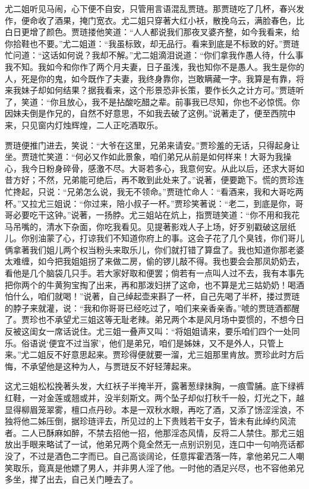 \begin{parag}


    尤二姐听见马闹，心下便不自安，只管用言语混乱贾琏。那贾琏吃了几杯，春兴发作，便命收了酒果，掩门宽衣。尤二姐只穿著大红小袄，散挽乌云，满脸春色，比白日更增了颜色。贾琏搂他笑道：“人人都说我们那夜叉婆齐整，如今我看来，给你拾鞋也不要。”尤二姐道：“我虽标致，却无品行。看来到底是不标致的好。”贾琏忙问道：“这话如何说？我却不解。”尤二姐滴泪说道：“你们拿我作愚人待，什么事我不知。我如今和你作了两个月夫妻，日子虽浅，我也知你不是愚人。我生是你的人，死是你的鬼，如今既作了夫妻，我终身靠你，岂敢瞒藏一字。我算是有靠，将来我妹子却如何结果？据我看来，这个形景恐非长策，要作长久之计方可。”贾琏听了，笑道：“你且放心，我不是拈酸吃醋之辈。前事我已尽知，你也不必惊慌。你因妹夫倒是作兄的，自然不好意思，不如我去破了这例。”说著走了，便至西院中来，只见窗内灯烛辉煌，二人正吃酒取乐。
\end{parag}


\begin{parag}


    贾琏便推门进去，笑说：“大爷在这里，兄弟来请安。”贾珍羞的无话，只得起身让坐。贾琏忙笑道：“何必又作如此景象，咱们弟兄从前是如何样来！大哥为我操心，我今日粉身碎骨，感激不尽。大哥若多心，我意何安。从此以后，还求大哥如昔方好；不然，兄弟能可绝后，再不敢到此处来了。”说著，便要跪下。慌的贾珍连忙搀起，只说：“兄弟怎么说，我无不领命。”贾琏忙命人：“看酒来，我和大哥吃两杯。”又拉尤三姐说：“你过来，陪小叔子一杯。”贾珍笑著说：“老二，到底是你，哥哥必要吃干这钟。”说著，一扬脖。尤三姐站在炕上，指贾琏笑道：“你不用和我花马吊嘴的，清水下杂面，你吃我看见。见提著影戏人子上场，好歹别戳破这层纸儿。你别油蒙了心，打谅我们不知道你府上的事。这会子花了几个臭钱，你们哥儿俩拿著我们姐儿两个权当粉头来取乐儿，你们就打错了算盘了。我也知道你那老婆太难缠，如今把我姐姐拐了来做二房，偷的锣儿敲不得。我也要会会那凤奶奶去，看他是几个脑袋几只手。若大家好取和便罢；倘若有一点叫人过不去，我有本事先把你两个的牛黄狗宝掏了出来，再和那泼妇拼了这命，也不算是尤三姑奶奶！喝酒怕什么，咱们就喝！”说著，自己绰起壶来斟了一杯，自己先喝了半杯，搂过贾琏的脖子来就灌，说：“我和你哥哥已经吃过了，咱们来亲香亲香。”唬的贾琏酒都醒了。贾珍也不承望尤三姐这等无耻老辣。弟兄两个本是风月场中耍惯的，不想今日反被这闺女一席话说住。尤三姐一叠声又叫：“将姐姐请来，要乐咱们四个一处同乐。俗语说‘便宜不过当家’，他们是弟兄，咱们是姊妹，又不是外人，只管上来。”尤二姐反不好意思起来。贾珍得便就要一溜，尤三姐那里肯放。贾珍此时方后悔，不承望他是这种为人，与贾琏反不好轻薄起来。
\end{parag}


\begin{parag}


    这尤三姐松松挽著头发，大红袄子半掩半开，露著葱绿抹胸，一痕雪脯。底下绿裤红鞋，一对金莲或翘或并，没半刻斯文。两个坠子却似打秋千一般，灯光之下，越显得柳眉笼翠雾，檀口点丹砂。本是一双秋水眼，再吃了酒，又添了饧涩淫浪，不独将他二姊压倒，据珍琏评去，所见过的上下贵贱若干女子，皆未有此绰约风流者。二人已酥麻如醉，不禁去招他一招，他那淫态风情，反将二人禁住。那尤三姐放出手眼来略试了一试，他弟兄两个竟全然无一点别识别见，连口中一句响亮话都没了，不过是酒色二字而已。自己高谈阔论，任意挥霍洒落一阵，拿他弟兄二人嘲笑取乐，竟真是他嫖了男人，并非男人淫了他。一时他的酒足兴尽，也不容他弟兄多坐，撵了出去，自己关门睡去了。
\end{parag}


